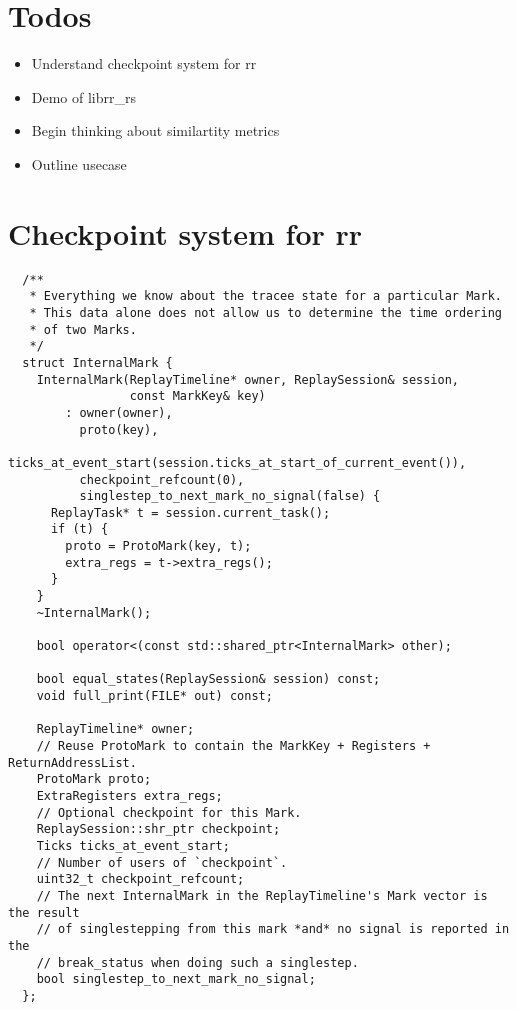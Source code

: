 \maketitle

\section{Todos}
\begin{itemize}
    \item Understand checkpoint system for rr 
    \item Demo of librr\_rs 
    \item Begin thinking about similartity metrics
    \item Outline usecase
\end{itemize}


\section{Checkpoint system for rr}
\begin{verbatim}
  /**
   * Everything we know about the tracee state for a particular Mark.
   * This data alone does not allow us to determine the time ordering
   * of two Marks.
   */
  struct InternalMark {
    InternalMark(ReplayTimeline* owner, ReplaySession& session,
                 const MarkKey& key)
        : owner(owner),
          proto(key),
          ticks_at_event_start(session.ticks_at_start_of_current_event()),
          checkpoint_refcount(0),
          singlestep_to_next_mark_no_signal(false) {
      ReplayTask* t = session.current_task();
      if (t) {
        proto = ProtoMark(key, t);
        extra_regs = t->extra_regs();
      }
    }
    ~InternalMark();

    bool operator<(const std::shared_ptr<InternalMark> other);

    bool equal_states(ReplaySession& session) const;
    void full_print(FILE* out) const;

    ReplayTimeline* owner;
    // Reuse ProtoMark to contain the MarkKey + Registers + ReturnAddressList.
    ProtoMark proto;
    ExtraRegisters extra_regs;
    // Optional checkpoint for this Mark.
    ReplaySession::shr_ptr checkpoint;
    Ticks ticks_at_event_start;
    // Number of users of `checkpoint`.
    uint32_t checkpoint_refcount;
    // The next InternalMark in the ReplayTimeline's Mark vector is the result
    // of singlestepping from this mark *and* no signal is reported in the
    // break_status when doing such a singlestep.
    bool singlestep_to_next_mark_no_signal;
  };
\end{verbatim}
